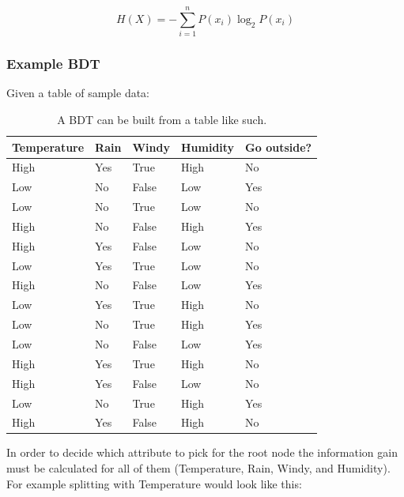 \documentclass[
12pt,
headsepline,
bibliography=totoc,
twoside=semi,
]{scrartcl}
\begin{document}
   
   \begin{equation}\label{fig:fig3}
      H(X)= - \sum_{i=1}^{n}P(x_i)\log_2{P(x_i)}
   \end{equation}  


 \subsubsection{Example BDT\label{sec:sec2-1-3}}
 Given a table of sample data: \\
 
 
 
   \begin{table}[]
      \begin{center}
         \begin{tabular}{|l|l|l|l||l|}
      \hline
      Temperature & Rain & Windy & Humidity & Go outside? \\
    \hline
    \hline
    High & Yes & True & High & No \\
    \hline
    Low& No & False & Low & Yes \\
    \hline
    Low& No & True & Low & No \\
    \hline
    High& No & False &  High& Yes \\
    \hline
    High&  Yes& False & Low & No \\
    \hline
    Low& Yes & True & Low & No \\
    \hline
    High& No &  False&  Low& Yes \\
    \hline
    Low&  Yes& True & High & No \\
    \hline
    Low&  No& True & High &  Yes\\
    \hline
    Low&  No&  False& Low & Yes \\
    \hline
    High&  Yes& True & High &  No\\
    \hline
    High&  Yes&  False& Low & No \\
    Low&  No& True& High & Yes\\
    \hline
    High& Yes & False & High & No\\
    \hline
   \end{tabular}\end{center}
   \label{fig:fig5}
   \caption{A BDT can be built from a table like such.}
   \end{table}


 
 In order to decide which attribute to pick for the root node the information gain must be calculated for all of them (Temperature, Rain, Windy, and Humidity). For example splitting with Temperature would look like this: \\
\end{document}
